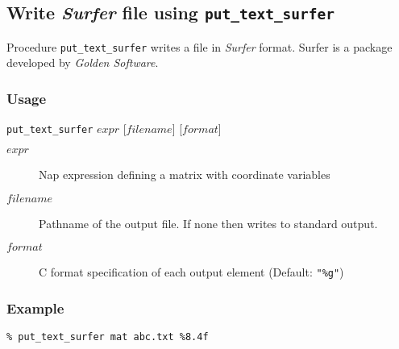   \subsection{Write \emph{Surfer} file using \texttt{put\_text\_surfer}}
    \label{geog-proc-put-text-surfer}

Procedure 
  \texttt{put\_text\_surfer} writes a file in 
  \emph{Surfer} format. Surfer is a package developed by 
  \emph{Golden Software}.

\subsubsection{Usage}

  \texttt{put\_text\_surfer} $\mathit{expr}$ [$\mathit{filename}$] [$\mathit{format}$]
  \begin{description}
    \item[$\mathit{expr}$]
    Nap expression defining a matrix with coordinate variables
    \item[$\mathit{filename}$]
    Pathname of the output file. If none then writes to standard output.
    \item[$\mathit{format}$]
    C format specification of each output element (Default: \texttt{"\%g"})
  \end{description}

  \subsubsection{Example}

  \texttt{\% put\_text\_surfer mat abc.txt \%8.4f}
